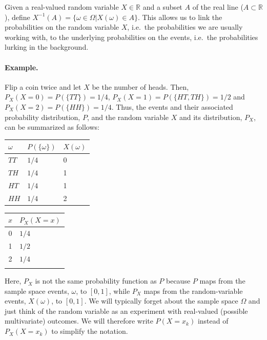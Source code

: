 \documentclass[
  14pt,
]{memoir}
\begin{document}
\bigskip

Given a real-valued random variable \(X\in\mathbb{R}\) and a subset \(A\) of the real line (\(A\subset\mathbb{R}\)), define \(X^{-1}(A)=\{\omega \in \Omega|X(\omega) \in A\}\). This allows us to link the probabilities on the random variable \(X\), i.e.~the probabilities we are usually working with, to the underlying probabilities on the events, i.e.~the probabilities lurking in the background.

\bigskip

\paragraph*{Example.}

Flip a coin twice and let \(X\) be the number of heads. Then, \(P_X(X=0)=P(\{T T\})=1 / 4\), \(P_X(X=1)=P(\{H T, T H\})=1 / 2\) and \(P_X(X=2)=P(\{H H\})=1 / 4\). Thus, the events and their associated probability distribution, \(P\), and the random variable \(X\) and its distribution, \(P_X\), can be summarized as follows:

\begin{center}
\begin{tabular}{l|l|l}
$\omega$ & $P(\{\omega\})$ & $X(\omega)$ \\
\hline$T T$ & $1 / 4$ & 0 \\
$T H$ & $1 / 4$ & 1 \\
$H T$ & $1 / 4$ & 1 \\
$H H$ & $1 / 4$ & 2
\end{tabular}\hspace*{2cm}
\begin{tabular}{c|l}
$x$ & $P_X(X=x)$ \\
\hline 0 & $1 / 4$ \\
1 & $1 / 2$ \\
2 & $1 / 4$\\
\multicolumn{2}{c}{}
\end{tabular}
\end{center}

Here, \(P_{X}\) is not the same probability function as \(P\) because \(P\) maps from the sample space events, \(\omega\), to \([0,1]\), while \(P_X\) maps from the random-variable events, \(X(\omega)\), to \([0,1]\). We will typically forget about the sample space \(\Omega\) and just think of the random variable as an experiment with real-valued (possible multivariate) outcomes. We will therefore write \(P\left(X=x_{k}\right)\) instead of \(P_{X}\left(X=x_{k}\right)\) to simplify the notation.
\end{document}
